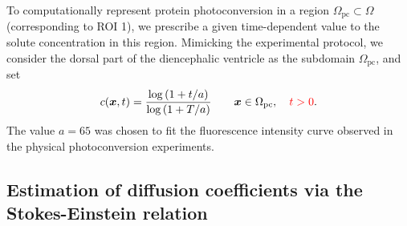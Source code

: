 \documentclass[fleqn]{wlscirep}
\newcommand{\Gp}{\Gamma_{p}}
\newcommand{\Ginj}{\Gamma_{\mathrm{inj}}}
\newcommand{\Gin}{\Gamma_{\mathrm{in}}}
\newcommand{\Gout}{\Gamma_{\mathrm{out}}}
\newcommand{\nn}{\mathbf{n}}
\newcommand{\uu}{\mathbf{u}}
\newcommand{\xx}{\bm{x}}
\newcommand{\lyng}[1]{\textcolor{blue}{#1}}
\newcommand{\fixme}[1]{\textcolor{red}{#1}}
\begin{document}

To computationally represent protein photoconversion in a region $\Omega_{\mathrm{pc}} \subset \Omega$ (corresponding to ROI 1), we prescribe a given time-dependent value to the solute concentration in this region. 
Mimicking the experimental protocol, we consider the dorsal part of the diencephalic ventricle as the subdomain $\Omega_{\mathrm{pc}}$, and set
\begin{equation}
  c(\xx, t)=\frac{\log{(1+t/a)}}{\log{(1+T/a)}}
  \qquad \xx \in \Omega_{\mathrm{pc}}, \quad \fixme{t > 0}.
\label{eq:injection_curve}
\end{equation}
The value $a=65$ was chosen to fit the fluorescence intensity curve observed in the physical photoconversion experiments.


\subsection*{Estimation of diffusion coefficients via the Stokes-Einstein relation}
\end{document}
